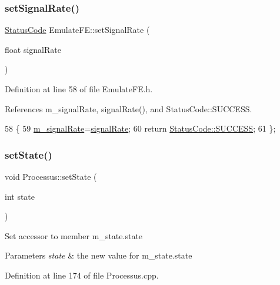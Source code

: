 \subsubsection{\texorpdfstring{set\+Signal\+Rate()}{setSignalRate()}}
{\footnotesize\ttfamily \hyperlink{classStatusCode}{Status\+Code} Emulate\+F\+E\+::set\+Signal\+Rate (\begin{DoxyParamCaption}\item[{float}]{signal\+Rate }\end{DoxyParamCaption})\hspace{0.3cm}{\ttfamily [inline]}}



Definition at line 58 of file Emulate\+F\+E.\+h.



References m\+\_\+signal\+Rate, signal\+Rate(), and Status\+Code\+::\+S\+U\+C\+C\+E\+SS.


\begin{DoxyCode}
58                                              \{
59     \hyperlink{classEmulateFE_a7aeff9e62f850ca6d7ee27dce02a060b}{m\_signalRate}=\hyperlink{classEmulateFE_a98d2e402e4707109ca14ee9f4d95c2fa}{signalRate};
60     \textcolor{keywordflow}{return} \hyperlink{classStatusCode_a6f565cbeadc76d14c72f047e5e85eb4badd0da38d3ba0d922efd1f4619bc37ad8}{StatusCode::SUCCESS};
61   \};
\end{DoxyCode}
\mbox{\label{classProcessus_ad38cde0f1bcefa00b068e7947b8af927}} 
\subsubsection{\texorpdfstring{set\+State()}{setState()}}
{\footnotesize\ttfamily void Processus\+::set\+State (\begin{DoxyParamCaption}\item[{int}]{state }\end{DoxyParamCaption})\hspace{0.3cm}{\ttfamily [inherited]}}

Set accessor to member m\+\_\+state.\+state 
\begin{DoxyParams}{Parameters}
{\em state} & the new value for m\+\_\+state.\+state \\
\hline
\end{DoxyParams}


Definition at line 174 of file Processus.\+cpp.



